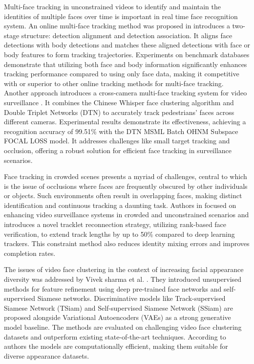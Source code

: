 Multi-face tracking in unconstrained videos to identify and maintain the identities of multiple faces over time is important in real time face recognition system. An online multi-face tracking method was proposed in \cite{weng_online_2023} introduces a two-stage structure: detection alignment and detection association. It aligns face detections with body detections and matches these aligned detections with face or body features to form tracking trajectories. Experiments on benchmark databases demonstrate that utilizing both face and body information significantly enhances tracking performance compared to using only face data, making it competitive with or superior to other online tracking methods for multi-face tracking. Another approach introduces a cross-camera multi-face tracking system for video surveillance \cite{ren_cross-camera_2021}. It combines the Chinese Whisper face clustering algorithm and Double Triplet Networks (DTN) to accurately track pedestrians' faces across different cameras. Experimental results demonstrate its effectiveness, achieving a recognition accuracy of 99.51\% with the DTN MSML Batch OHNM Subspace FOCAL LOSS model. It addresses challenges like small target tracking and occlusion, offering a robust solution for efficient face tracking in surveillance scenarios.

Face tracking in crowded scenes presents a myriad of challenges, central to which is the issue of occlusions where faces are frequently obscured by other individuals or objects. Such environments often result in overlapping faces, making distinct identification and continuous tracking a daunting task. Authors in \cite{barquero_rank-based_2021} focused on enhancing video surveillance systems in crowded and unconstrained scenarios and introduces a novel tracklet reconnection strategy, utilizing rank-based face verification, to extend track lengths by up to 50\% compared to deep learning trackers. This constraint method also reduces identity mixing errors and improves completion rates.

The issues of video face clustering in the context of increasing facial appearance diversity was addressed by Vivek sharma et al. \cite{sharma_video_2020}. They introduced unsupervised methods for feature refinement using deep pre-trained face networks and self-supervised Siamese networks. Discriminative models like Track-supervised Siamese Network (TSiam) and Self-supervised Siamese Network (SSiam) are proposed alongside Variational Autoencoders (VAEs) as a strong generative model baseline. The methods are evaluated on challenging video face clustering datasets and outperform existing state-of-the-art techniques. According to authors the models are computationally efficient, making them suitable for diverse appearance datasets.